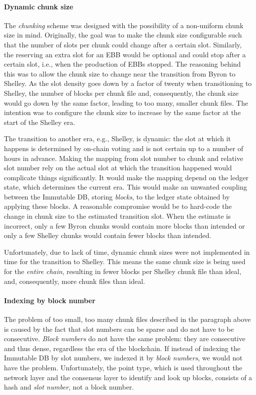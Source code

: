 \paragraph{Dynamic chunk size}

The \emph{chunking} scheme was designed with the possibility of a non-uniform
chunk size in mind. Originally, the goal was to make the chunk size configurable
such that the number of slots per chunk could change after a certain slot.
Similarly, the reserving an extra slot for an EBB would be optional and could
stop after a certain slot, i.e., when the production of EBBs stopped. The
reasoning behind this was to allow the chunk size to change near the transition
from Byron to Shelley. As the slot density goes down by a factor of twenty when
transitioning to Shelley, the number of blocks per chunk file and, consequently,
the chunk size would go down by the same factor, leading to too many, smaller
chunk files. The intention was to configure the chunk size to increase by the
same factor at the start of the Shelley era.

The transition to another era, e.g., Shelley, is dynamic: the slot at which it
happens is determined by on-chain voting and is not certain up to a number of
hours in advance. Making the mapping from slot number to chunk and relative slot
number rely on the actual slot at which the transition happened would complicate
things significantly. It would make the mapping depend on the ledger state,
which determines the current era. This would make an unwanted coupling between
the Immutable DB, storing \emph{blocks}, to the ledger state obtained by
applying these blocks. A reasonable compromise would be to hard-code the change
in chunk size to the estimated transition slot. When the estimate is incorrect,
only a few Byron chunks would contain more blocks than intended or only a few
Shelley chunks would contain fewer blocks than intended.

Unfortunately, due to lack of time, dynamic chunk sizes were not implemented in
time for the transition to Shelley. This means the same chunk size is being used
for the \emph{entire chain}, resulting in fewer blocks per Shelley chunk file
than ideal, and, consequently, more chunk files than ideal.

\paragraph{Indexing by block number}

The problem of too small, too many chunk files described in the paragraph above
is caused by the fact that slot numbers can be sparse and do not have to be
consecutive. \emph{Block numbers} do not have the same problem: they are
consecutive and thus dense, regardless the era of the blockchain. If instead of
indexing the Immutable DB by slot numbers, we indexed it by \emph{block
numbers}, we would not have the problem. Unfortunately, the point type, which is
used throughout the network layer and the consensus layer to identify and look
up blocks, consists of a hash and \emph{slot number}, not a block number.

